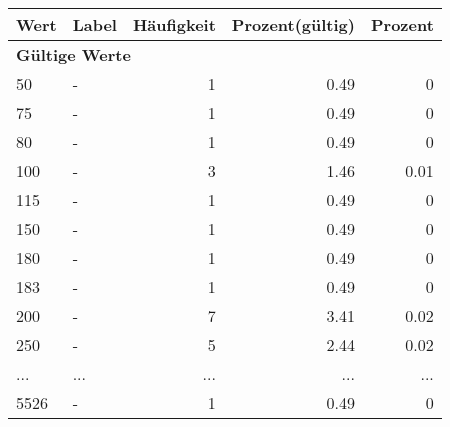      \begin{longtable}{lXrrr}
     \toprule
     \textbf{Wert} & \textbf{Label} & \textbf{Häufigkeit} & \textbf{Prozent(gültig)} & \textbf{Prozent} \\
     \endhead
     \midrule
     \multicolumn{5}{l}{\textbf{Gültige Werte}}\\
        50 & \multicolumn{1}{X}{-} & %
          \num{1} &
          \num[round-mode=places,round-precision=2]{0,49} &
          \num[round-mode=places,round-precision=2]{0} \\
        75 & \multicolumn{1}{X}{-} & %
          \num{1} &
          \num[round-mode=places,round-precision=2]{0,49} &
          \num[round-mode=places,round-precision=2]{0} \\
        80 & \multicolumn{1}{X}{-} & %
          \num{1} &
          \num[round-mode=places,round-precision=2]{0,49} &
          \num[round-mode=places,round-precision=2]{0} \\
        100 & \multicolumn{1}{X}{-} & %
          \num{3} &
          \num[round-mode=places,round-precision=2]{1,46} &
          \num[round-mode=places,round-precision=2]{0,01} \\
        115 & \multicolumn{1}{X}{-} & %
          \num{1} &
          \num[round-mode=places,round-precision=2]{0,49} &
          \num[round-mode=places,round-precision=2]{0} \\
        150 & \multicolumn{1}{X}{-} & %
          \num{1} &
          \num[round-mode=places,round-precision=2]{0,49} &
          \num[round-mode=places,round-precision=2]{0} \\
        180 & \multicolumn{1}{X}{-} & %
          \num{1} &
          \num[round-mode=places,round-precision=2]{0,49} &
          \num[round-mode=places,round-precision=2]{0} \\
        183 & \multicolumn{1}{X}{-} & %
          \num{1} &
          \num[round-mode=places,round-precision=2]{0,49} &
          \num[round-mode=places,round-precision=2]{0} \\
        200 & \multicolumn{1}{X}{-} & %
          \num{7} &
          \num[round-mode=places,round-precision=2]{3,41} &
          \num[round-mode=places,round-precision=2]{0,02} \\
        250 & \multicolumn{1}{X}{-} & %
          \num{5} &
          \num[round-mode=places,round-precision=2]{2,44} &
          \num[round-mode=places,round-precision=2]{0,02} \\
       ... & ... & ... & ... & ... \\
        5526 & \multicolumn{1}{X}{-} & %
          \num{1} &
          \num[round-mode=places,round-precision=2]{0,49} &
          \num[round-mode=places,round-precision=2]{0} \\


\end{longtable}
